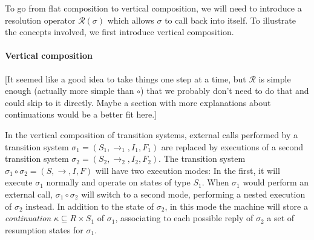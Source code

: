 \documentclass[sigplan,10pt,review,anonymous]{acmart}
\begin{document}
To go from flat composition to vertical composition,
we will need to introduce a resolution operator $\mathcal{R}(\sigma)$
which allows $\sigma$ to call back into itself.
To illustrate the concepts involved,
we first introduce vertical composition.


\paragraph{Vertical composition} %

[It seemed like a good idea to take things one step at a time,
but $\mathcal{R}$ is simple enough (actually more simple than $\circ$)
that we probably don't need to do that and could skip to it directly.
Maybe a section with more explanations about continuations would
be a better fit here.]

In the vertical composition of transition systems,
external calls performed by a transition system
$\sigma_1 = (S_1, \rightarrow_1, I_1, F_1)$
are replaced by executions of a second transition system
$\sigma_2 = (S_2, \rightarrow_2, I_2, F_2)$.
The transition system
$\sigma_1 \circ \sigma_2 = (S, \rightarrow, I, F)$
will have two execution modes:
In the first,
it will execute $\sigma_1$ normally and
operate on states of type $S_1$.
When $\sigma_1$ would perform an external call,
$\sigma_1 \circ \sigma_2$ will switch to a second mode,
performing a nested execution of $\sigma_2$ instead.
In addition to the state of $\sigma_2$,
in this mode the machine will store a \emph{continuation}
$\kappa \subseteq R \times S_1$
of $\sigma_1$,
associating to each possible reply of $\sigma_2$
a set of resumption states for $\sigma_1$.
\end{document}
